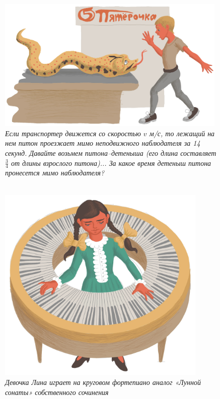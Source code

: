 \documentclass[10pt]{scrbook} \usepackage{modules/nonstahp_book}
\begin{document}
\begin{figure} \begin{center}
	\includegraphics[width=11cm]{figures/color/04c.jpg}
	\vspace{1cm}
	\caption{
             {\itshape  Если транспортер движется со скоростью $v$ м/с, то лежащий 
             на нем питон проезжает мимо неподвижного наблюдателя за 14 секунд. 
             Давайте возьмем питона–детеныша (его длина составляет $\tfrac{3}{4}$ от 
             длины взрослого питона)... %
             За какое время детеныш питона пронесется мимо наблюдателя? }\medskip\\
             \\
             }
\end{center} \end{figure}

\vfill\eject

\begin{figure} \begin{center}
	\includegraphics[width=10cm]{figures/color/06c.jpg}
	\vspace{1cm}
	\caption{
             {\itshape  Девочка Лина играет на круговом фортепиано аналог 
              «Лунной сонаты» собственного сочинения }\medskip\\
             \\
             }
\end{center} \end{figure}
\end{document}
